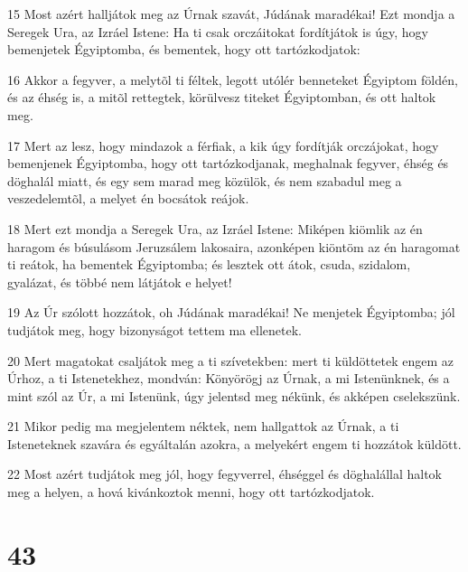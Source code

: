\par 15 Most azért halljátok meg az Úrnak szavát, Júdának maradékai! Ezt mondja a Seregek Ura, az Izráel Istene: Ha ti csak orczáitokat fordítjátok is úgy, hogy bemenjetek Égyiptomba, és bementek, hogy ott tartózkodjatok:
\par 16 Akkor a fegyver, a melytõl ti féltek, legott utólér benneteket Égyiptom földén, és az éhség is, a mitõl rettegtek, körülvesz titeket Égyiptomban, és ott haltok meg.
\par 17 Mert az lesz, hogy mindazok a férfiak, a kik úgy fordítják orczájokat, hogy bemenjenek Égyiptomba, hogy ott tartózkodjanak, meghalnak fegyver, éhség és döghalál miatt, és egy sem marad meg közülök, és nem szabadul meg a veszedelemtõl, a melyet én bocsátok reájok.
\par 18 Mert ezt mondja a Seregek Ura, az Izráel Istene: Miképen kiömlik az én haragom és búsulásom Jeruzsálem lakosaira, azonképen kiöntöm az én haragomat ti reátok, ha bementek Égyiptomba; és lesztek ott átok, csuda, szidalom, gyalázat, és többé nem látjátok e helyet!
\par 19 Az Úr szólott hozzátok, oh Júdának maradékai! Ne menjetek Égyiptomba; jól tudjátok meg, hogy bizonyságot tettem ma ellenetek.
\par 20 Mert magatokat csaljátok meg a ti szívetekben: mert ti küldöttetek engem az Úrhoz, a ti Istenetekhez, mondván: Könyörögj az Úrnak, a mi Istenünknek, és a mint  szól az Úr, a mi Istenünk, úgy jelentsd meg nékünk, és akképen cselekszünk.
\par 21 Mikor pedig ma megjelentem néktek, nem hallgattok az Úrnak, a ti Isteneteknek szavára és egyáltalán azokra, a melyekért engem ti hozzátok küldött.
\par 22 Most azért tudjátok meg jól, hogy fegyverrel, éhséggel és döghalállal haltok meg a helyen, a hová kivánkoztok menni, hogy ott tartózkodjatok.

\chapter{43}

